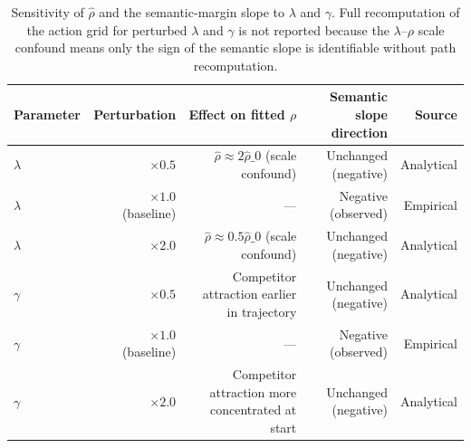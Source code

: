 \begin{table}[htbp]
\centering
\caption{Sensitivity of $\hat{\rho}$ and the semantic-margin slope to $\lambda$ and $\gamma$. Full recomputation of the action grid for perturbed $\lambda$ and $\gamma$ is not reported because the $\lambda$--$\rho$ scale confound means only the sign of the semantic slope is identifiable without path recomputation.}
\label{tab:sensitivity-lambda-gamma}
\begin{tabular}{lrrrr}
\toprule
Parameter & Perturbation & Effect on fitted $\rho$ & Semantic slope direction & Source \\
\midrule
$\lambda$ & $\times 0.5$ & $\hat{\rho} \approx 2\hat{\rho}\_0$ (scale confound) & Unchanged (negative) & Analytical \\
$\lambda$ & $\times 1.0$ (baseline) & --- & Negative (observed) & Empirical \\
$\lambda$ & $\times 2.0$ & $\hat{\rho} \approx 0.5\hat{\rho}\_0$ (scale confound) & Unchanged (negative) & Analytical \\
$\gamma$ & $\times 0.5$ & Competitor attraction earlier in trajectory & Unchanged (negative) & Analytical \\
$\gamma$ & $\times 1.0$ (baseline) & --- & Negative (observed) & Empirical \\
$\gamma$ & $\times 2.0$ & Competitor attraction more concentrated at start & Unchanged (negative) & Analytical \\
\bottomrule
\end{tabular}
\end{table}